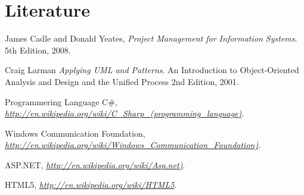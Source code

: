 \section{Literature}
\begin{thebibliography}{9}

  James Cadle and Donald Yeates,
  \emph{Project Management for Information Systems}.
  5th Edition,
  2008.

  Craig Larman
  \emph{Applying UML and Patterns}.
  An Introduction to Object-Oriented Analysis and Design and the Unified Process
  2nd Edition,
  2001.

	Programmering Language C\#, 
  \emph{\url{http://en.wikipedia.org/wiki/C_Sharp_(programming_language)}}.
  
	Windows Communication Foundation, 
  \emph{\url{http://en.wikipedia.org/wiki/Windows_Communication_Foundation)}}.
  
	ASP.NET, 
  \emph{\url{http://en.wikipedia.org/wiki/Asp.net)}}.
  
	HTML5, 
  \emph{\url{http://en.wikipedia.org/wiki/HTML5}}.
  

\end{thebibliography}